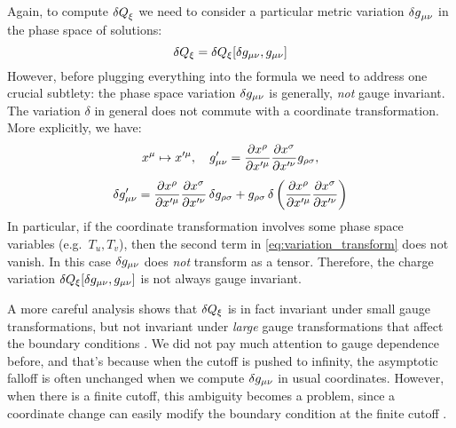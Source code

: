 \documentclass[12pt,a4paper,utf8]{article}
\begin{document}
	Again, to compute $\mathinner{\delta Q}_\xi$ we need to consider a particular metric variation $\mathinner{\delta g}_{\mu\nu}$ in the phase space of solutions:
	\begin{equation}
		\delta Q_\xi
		= \delta Q_{\xi} [\delta g_{\mu\nu}, g_{\mu\nu}]
	\end{equation}
	However, before plugging everything into the formula we need to address one crucial subtlety: the phase space variation $\mathinner{\delta g_{\mu\nu}}$ is generally, \textit{not} gauge invariant. The variation $\delta$ in general does not commute with a coordinate transformation. More explicitly, we have:
	\begin{gather}
		x^\mu \mapsto x'^\mu,
	\quad
		g'_{\mu\nu}
		= \frac{\partial{x^\rho}}{\partial{x'^\mu}}
			\frac{\partial{x^\sigma}}{\partial{x'^\nu}}
			g_{\rho\sigma},
	\\[1ex]
		\mathinner{\delta g'_{\mu\nu}}
		= \frac{\partial{x^\rho}}{\partial{x'^\mu}}
			\frac{\partial{x^\sigma}}{\partial{x'^\nu}}
			\mathinner{\delta g_{\rho\sigma}}
		+ g_{\rho\sigma} \mathinner{\delta \left(
				\frac{\partial{x^\rho}}{\partial{x'^\mu}}
				\frac{\partial{x^\sigma}}{\partial{x'^\nu}}
			\right)}
	\end{gather}
	In particular, if the coordinate transformation involves some phase space variables (e.g.\ $T_u,T_v$), then the second term in \eqref{eq:variation_transform} does not vanish. In this case $\mathinner{\delta g_{\mu\nu}}$ does \textit{not} transform as a tensor. Therefore, the charge variation $
		\delta Q_{\xi} [\delta g_{\mu\nu}, g_{\mu\nu}]
	$ is not always gauge invariant. 
	
	A more careful analysis shows that $
		\delta Q_{\xi}
	$ is in fact invariant under small gauge transformations, but not invariant under \textit{large} gauge transformations that affect the boundary conditions . 
	We did not pay much attention to gauge dependence before, and that's because when the cutoff is pushed to infinity, the asymptotic falloff is often unchanged when we compute $\mathinner{\delta g_{\mu\nu}}$ in usual coordinates. However, when there is a finite cutoff, this ambiguity becomes a problem, since a coordinate change can easily modify the boundary condition at the finite cutoff \cite{Guica:2019nzm,Kraus:2021cwf}. 
	
\end{document}
